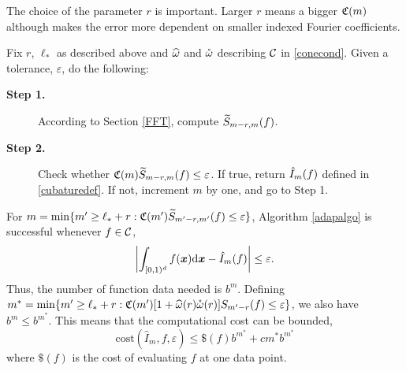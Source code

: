 \documentclass[graybox]{svmult}
\newcommand{\bsx}{\boldsymbol{x}}    %
\begin{document}
The choice of the parameter $r$ is important. Larger $r$ means a bigger $\mathfrak{C}(m)$ although makes the error more dependent on smaller indexed Fourier coefficients.

\begin{algo} \label{adapalgo} Fix $r$, $\ell_*$ as described above and $\widehat{\omega}$ and $\mathring{\omega}$ describing $\mathcal{C}$ in \eqref{conecond}. Given a tolerance, $\varepsilon$, do the following:

\begin{description}
\item[\textbf{Step 1.}] According to Section \ref{FFT}, compute $\widetilde{S}_{m-r,m}(f)$.
\item[\textbf{Step 2.}] Check whether $\mathfrak{C}(m)  \widetilde{S}_{m-r,m}(f) \le \varepsilon$. If true, return $\hat{I}_m(f)$ defined in \eqref{cubaturedef}. If not, increment $m$ by one, and go to Step 1.
\end{description}
\end{algo}

\begin{theorem} \label{adapalgothm} For $m = \min \{m' \ge \ell_*+r : \mathfrak{C}(m')  \widetilde{S}_{m'-r,m'}(f) \le \varepsilon \}$, Algorithm \ref{adapalgo} is successful whenever $f\in\mathcal{C}$,
\[
\biggabs{\int_{\cube} f(\bsx) \D \bsx - \hI_m(f)} \le \varepsilon.
\]
Thus, the number of function data needed is $b^m$. Defining $m^* = \min \{m' \ge \ell_*+r : \mathfrak{C}(m') [1+ \widehat{\omega}(r) \mathring{\omega}(r)] S_{m'-r}(f) \le \varepsilon \}$, we also have $b^m\leq b^{m^*}$. This means that the computational cost can be bounded,
\[
\mathrm{cost}\left(\widehat{I}_m,f,\varepsilon\right)\leq \$(f)b^{m^*}+cm^*b^{m^*}
\]
where $\$(f)$ is the cost of evaluating $f$ at one data point.
\end{theorem}
\end{document}
